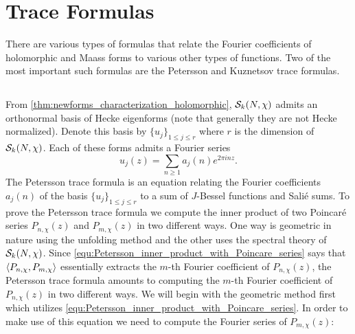 \chapter{Trace Formulas}
  There are various types of formulas that relate the Fourier coefficients of holomorphic and Maass forms to various other types of functions. Two of the most important such formulas are the Petersson and Kuznetsov trace formulas.
  \section{}
    From \cref{thm:newforms_characterization_holomorphic}, $\mathcal{S}_{k}(N,\chi)$ admits an orthonormal basis of Hecke eigenforms (note that generally they are not Hecke normalized). Denote this basis by $\{u_{j}\}_{1 \le j \le r}$ where $r$ is the dimension of $\mathcal{S}_{k}(N,\chi)$. Each of these forms admits a Fourier series
    \[
      u_{j}(z) = \sum_{n \ge 1}a_{j}(n)e^{2\pi inz}.
    \]
    The Petersson trace formula is an equation relating the Fourier coefficients $a_{j}(n)$ of the basis $\{u_{j}\}_{1 \le j \le r}$ to a sum of $J$-Bessel functions and Sali\'e sums. To prove the Petersson trace formula we compute the inner product of two Poincar\'e series $P_{n,\chi}(z)$ and $P_{m,\chi}(z)$ in two different ways. One way is geometric in nature using the unfolding method and the other uses the spectral theory of $\mathcal{S}_{k}(N,\chi)$. Since \cref{equ:Petersson_inner_product_with_Poincare_series} says that $\langle P_{n,\chi},P_{m,\chi}\rangle$ essentially extracts the $m$-th Fourier coefficient of $P_{n,\chi}(z)$, the Petersson trace formula amounts to computing the $m$-th Fourier coefficient of $P_{n,\chi}(z)$ in two different ways. We will begin with the geometric method first which utilizes \cref{equ:Petersson_inner_product_with_Poincare_series}. In order to make use of this equation we need to compute the Fourier series of $P_{m,\chi}(z)$:

